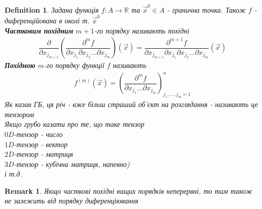 \documentclass[a4paper, 14pt]{extarticle}
\theoremstyle{theoremdd}
\theoremstyle{theoremdd}
\newtheorem{definition}[theorem]{Definition}
\theoremstyle{theoremdd}
\theoremstyle{theoremdd}
\newtheorem{remark}[theorem]{Remark}
\theoremstyle{theoremdd}
\theoremstyle{theoremdd}
\theoremstyle{theoremdd}
\begin{document}
\begin{definition}
Задана функція $f: A \to \mathbb{R}$ та $\vec{x}^0 \in A$ - гранична точка. Також $f$ - диференційована в околі т. $\vec{x}^0$\\
\textbf{Частковим похідним} $m+1$-го порядку називають похідні
\begin{align*}
\dfrac{\partial}{\partial x_{j_{m+1}}} \left( \dfrac{\partial^m f}{\partial x_{j_1} \partial x_{j_2} \dots \partial x_{j_m}} \right)(\vec{x}) = \dfrac{\partial^{m+1} f}{\partial x_{j_{m+1}} \partial x_{j_1} \partial x_{j_2} \dots \partial x_{j_m}}(\vec{x})
\end{align*}
\textbf{Похідною} $m$-го порядку функції $f$ називають
\begin{align*}
f^{(m)}(\vec{x}) = \left( \dfrac{\partial^m f}{\partial x_{j_1} \dots \partial x_{j_m}} \right)^n_{j_1,\dots,j_m=1}
\end{align*}
Як казав ГБ, ця річ - вже більш страший об'єкт на розглядання - називають це тензором\\
Якщо грубо казати про те, що таке тензор\\
$0D$-тензор - число\\
$1D$-тензор - вектор\\
$2D$-тензор - матриця\\
$3D$-тензор - кубічна матриця, напевно)\\
і т.д.
\end{definition}

\begin{remark}
Якщо часткові похідні вищих порядків неперервні, то там також не залежить від порядку диференціювання
\end{remark}
\end{document}
